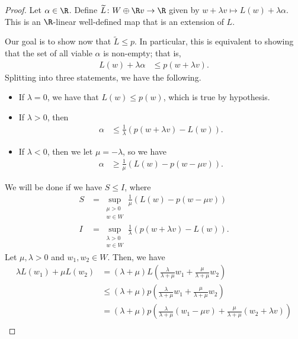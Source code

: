 \documentclass[10pt]{mypackage}
\begin{document}
\begin{proof}
  Let $\alpha\in \R$. Define $ \widetilde{L}\colon W\oplus \R v \to \R $ given by $w + \lambda v \mapsto L(w) + \lambda\alpha $. This is an $\R$-linear well-defined map that is an extension of $L$.

  Our goal is to show now that $ \widetilde{L}\leq p $. In particular, this is equivalent to showing that the set of all viable $\alpha$ is non-empty; that is,
  \begin{align*}
    L(w) + \lambda\alpha &\leq p\left( w + \lambda v \right).
  \end{align*}
  Splitting into three statements, we have the following.
  \begin{itemize}
    \item If $\lambda = 0$, we have that $L(w)\leq p(w)$, which is true by hypothesis.
    \item If $\lambda > 0$, then
      \begin{align*}
        \alpha &\leq \frac{1}{\lambda}\left( p\left( w + \lambda v \right) - L(w) \right).
      \end{align*}
    \item If $\lambda < 0$, then we let $\mu = -\lambda$, so we have
      \begin{align*}
        \alpha &\geq \frac{1}{\mu}\left( L(w) - p\left( w-\mu v \right) \right).
      \end{align*}
  \end{itemize}
  We will be done if we have $S\leq I$, where
  \begin{align*}
    S &= \sup_{\substack{\mu > 0\\w\in W}} \frac{1}{\mu}\left( L\left( w \right) - p\left( w-\mu v \right) \right)\\
    I &= \sup_{\substack{\lambda > 0\\w\in W}} \frac{1}{\lambda}\left( p\left( w + \lambda v \right) - L(w) \right).
  \end{align*}
  Let $\mu,\lambda > 0$ and $w_1,w_2\in W$. Then, we have
  \begin{align*}
    \lambda L\left( w_1 \right) + \mu L\left( w_2 \right) &= \left( \lambda + \mu \right)L\left( \frac{\lambda}{\lambda + \mu}w_1 + \frac{\mu}{\lambda + \mu}w_2 \right)\\
                                                          &\leq \left( \lambda + \mu \right)p\left( \frac{\lambda}{\lambda + \mu}w_1 + \frac{\mu}{\lambda + \mu}w_2 \right)\\
                                                          &= \left( \lambda + \mu \right)p\left( \frac{\lambda}{\lambda + \mu}\left( w_1-\mu v \right) + \frac{\mu}{\lambda + \mu}\left( w_2 + \lambda v \right) \right)\\

\end{align*}
\end{proof}
\end{document}
